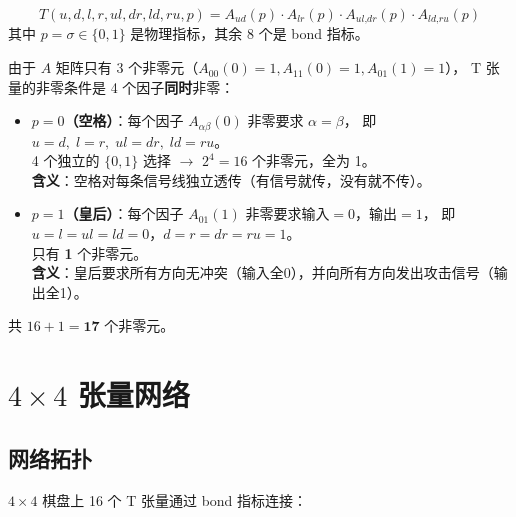 \documentclass[12pt,a4paper]{article}
\begin{document}
\begin{keybox}[T 张量的构造公式]
\[
T(u,d,l,r,\textit{ul},\textit{dr},\textit{ld},\textit{ru},p) = A_{ud}(p) \cdot A_{lr}(p) \cdot A_{\textit{ul},\textit{dr}}(p) \cdot A_{\textit{ld},\textit{ru}}(p)
\]
其中 $p = \sigma \in \{0,1\}$ 是物理指标，其余 8 个是 bond 指标。
\end{keybox}

由于 $A$ 矩阵只有 3 个非零元（$A_{00}(0)=1, A_{11}(0)=1, A_{01}(1)=1$），
T 张量的非零条件是 4 个因子\textbf{同时}非零：

\begin{itemize}
  \item \textbf{$p=0$（空格）}：每个因子 $A_{\alpha\beta}(0)$ 非零要求 $\alpha=\beta$，
        即 $u\!=\!d,\; l\!=\!r,\; ul\!=\!dr,\; ld\!=\!ru$。\\
        4 个独立的 $\{0,1\}$ 选择 $\to$ $2^4=16$ 个非零元，全为 1。\\
        \textbf{含义}：空格对每条信号线独立透传（有信号就传，没有就不传）。
  \item \textbf{$p=1$（皇后）}：每个因子 $A_{01}(1)$ 非零要求输入$=0$，输出$=1$，
        即 $u\!=\!l\!=\!ul\!=\!ld\!=\!0$，$d\!=\!r\!=\!dr\!=\!ru\!=\!1$。\\
        只有 \textbf{1} 个非零元。\\
        \textbf{含义}：皇后要求所有方向无冲突（输入全0），并向所有方向发出攻击信号（输出全1）。
\end{itemize}

共 $16 + 1 = \textbf{17}$ 个非零元。

\section{$4\times 4$ 张量网络}

\subsection{网络拓扑}

$4\times 4$ 棋盘上 16 个 T 张量通过 bond 指标连接：
\end{document}
